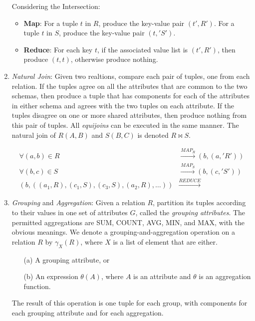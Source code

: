 \begin{enumerate}
    Considering the Intersection: 
    \begin{itemize}
        \item \textbf{Map}: For a tuple $t$ in $R$, produce the key-value pair $(t', R')$. For a tuple $t$ in $S$, produce the key-value pair $(t, 'S')$.
        \item \textbf{Reduce}: For each key $t$, if the associated value list is $(t', R')$, then produce $(t, t)$, otherwise produce nothing.
    \end{itemize}

\item \textit{Natural Join}: Given two realtions, compare each pair of tuples, one from each relation. If the tuples agree on all the attributes that are common to the two schemas, then produce a tuple that has components for each of the attributes in either schema and agrees with the two tuples on each attribute. If the tuples disagree on one or more shared attributes, then produce nothing from this pair of tuples. All \textit{equijoins} can be executed in the same manner. The natural join of $R(A,B)$ and $S(B,C)$ is denoted $R \bowtie S$. 
    
    \begin{equation*}
        \begin{split}
                                          \forall (a,b)\in R & \xrightarrow{MAP_R} (b,(a, 'R')) \\
                                          \forall (b,c)\in S & \xrightarrow{MAP_S} (b, (c, 'S')) \\
            (b, ((a_1,R),(c_1, S), (c_3, S),(a_2, R),\dots)) & \xrightarrow{REDUCE} 
        \end{split}
    \end{equation*}


\item \textit{Grouping} and \textit{Aggregation}: Given a relation $R$, partition its tuples according to their values in one set of attributes $G$, called the \textit{grouping attributes}. The permitted aggregations are SUM, COUNT, AVG, MIN, and MAX, with the obvious meanings. We denote a grouping-and-aggregation operation on a relation $R$ by $\gamma_{X}(R)$, where $X$ is a list of element that are either.
    \begin{itemize}
        \item[(a)] A grouping attribute, or 
        \item[(b)] An expression $\theta(A)$, where $A$ is an attribute and $\theta$ is an aggregation function.
    \end{itemize}
    The result of this operation is one tuple for each group, with components for each grouping attribute and for each aggregation.
\end{enumerate}









